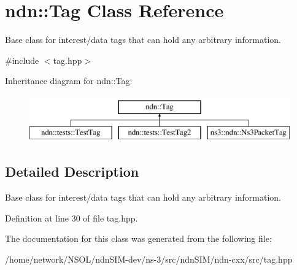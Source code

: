 \hypertarget{classndn_1_1Tag}{}\section{ndn\+:\+:Tag Class Reference}
\label{classndn_1_1Tag}


Base class for interest/data tags that can hold any arbitrary information.  




{\ttfamily \#include $<$tag.\+hpp$>$}

Inheritance diagram for ndn\+:\+:Tag\+:\begin{figure}[H]
\begin{center}
\leavevmode
\includegraphics[height=2.000000cm]{classndn_1_1Tag}
\end{center}
\end{figure}


\subsection{Detailed Description}
Base class for interest/data tags that can hold any arbitrary information. 

Definition at line 30 of file tag.\+hpp.



The documentation for this class was generated from the following file\+:\begin{DoxyCompactItemize}
\item 
/home/network/\+N\+S\+O\+L/ndn\+S\+I\+M-\/dev/ns-\/3/src/ndn\+S\+I\+M/ndn-\/cxx/src/tag.\+hpp\end{DoxyCompactItemize}
